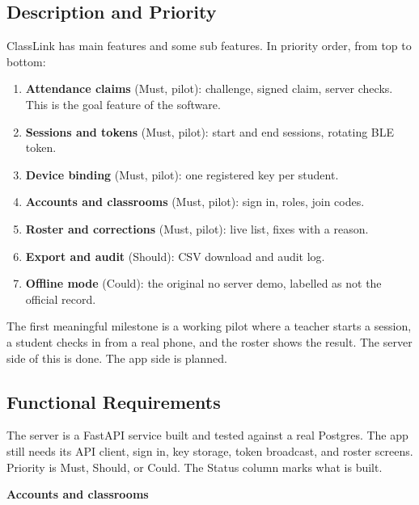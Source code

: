 \hypertarget{description-and-priority}{%
\subsection{Description and Priority}\label{description-and-priority}}

ClassLink has main features and some sub features. In priority order, from top to bottom:

\begin{enumerate}
\def\labelenumi{\arabic{enumi}.}
\tightlist
\item
  \textbf{Attendance claims} (Must, pilot): challenge, signed claim, server checks. This is the goal feature of the software.
\item
  \textbf{Sessions and tokens} (Must, pilot): start and end sessions, rotating BLE token.
\item
  \textbf{Device binding} (Must, pilot): one registered key per student.
\item
  \textbf{Accounts and classrooms} (Must, pilot): sign in, roles, join codes.
\item
  \textbf{Roster and corrections} (Must, pilot): live list, fixes with a reason.
\item
  \textbf{Export and audit} (Should): CSV download and audit log.
\item
  \textbf{Offline mode} (Could): the original no server demo, labelled as not the official record.
\end{enumerate}

The first meaningful milestone is a working pilot where a teacher starts a session, a student checks in from a real phone, and the roster shows the result. The server side of this is done. The app side is planned.

\hypertarget{functional-requirements}{%
\subsection{Functional Requirements}\label{functional-requirements}}

The server is a FastAPI service built and tested against a real Postgres. The app still needs its API client, sign in, key storage, token broadcast, and roster screens. Priority is Must, Should, or Could. The Status column marks what is built.

\textbf{Accounts and classrooms}

